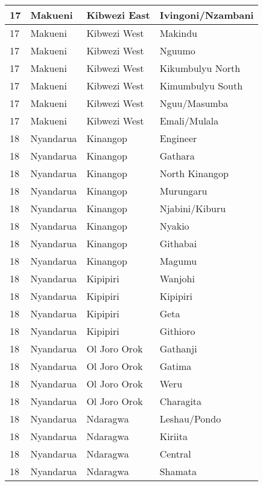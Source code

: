 \begin{table}[!ht]
\begin{tabular}{|l|l|l|l|}
        17 & Makueni & Kibwezi East & Ivingoni/Nzambani \\ \hline
        17 & Makueni & Kibwezi West & Makindu \\ \hline
        17 & Makueni & Kibwezi West & Nguumo \\ \hline
        17 & Makueni & Kibwezi West & Kikumbulyu North \\ \hline
        17 & Makueni & Kibwezi West & Kimumbulyu South \\ \hline
        17 & Makueni & Kibwezi West & Nguu/Masumba \\ \hline
        17 & Makueni & Kibwezi West & Emali/Mulala \\ \hline
        18 & Nyandarua & Kinangop & Engineer \\ \hline
        18 & Nyandarua & Kinangop & Gathara \\ \hline
        18 & Nyandarua & Kinangop & North Kinangop \\ \hline
        18 & Nyandarua & Kinangop & Murungaru \\ \hline
        18 & Nyandarua & Kinangop & Njabini/Kiburu \\ \hline
        18 & Nyandarua & Kinangop & Nyakio \\ \hline
        18 & Nyandarua & Kinangop & Githabai \\ \hline
        18 & Nyandarua & Kinangop & Magumu \\ \hline
        18 & Nyandarua & Kipipiri & Wanjohi \\ \hline
        18 & Nyandarua & Kipipiri & Kipipiri \\ \hline
        18 & Nyandarua & Kipipiri & Geta \\ \hline
        18 & Nyandarua & Kipipiri & Githioro \\ \hline
        18 & Nyandarua & Ol Joro Orok & Gathanji \\ \hline
        18 & Nyandarua & Ol Joro Orok & Gatima \\ \hline
        18 & Nyandarua & Ol Joro Orok & Weru \\ \hline
        18 & Nyandarua & Ol Joro Orok & Charagita \\ \hline
        18 & Nyandarua & Ndaragwa & Leshau/Pondo \\ \hline
        18 & Nyandarua & Ndaragwa & Kiriita \\ \hline
        18 & Nyandarua & Ndaragwa & Central \\ \hline
        18 & Nyandarua & Ndaragwa & Shamata \\ \hline

\end{tabular}
\end{table}
